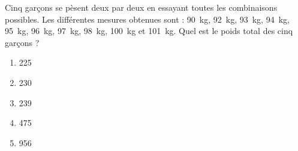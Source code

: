 Cinq garçons se pèsent deux par deux en essayant toutes les combinaisons possibles. Les différentes mesures obtenues sont : 90~kg, 92~kg, 93~kg, 94~kg, 95~kg, 96~kg, 97~kg, 98~kg, 100~kg et 101~kg. Quel est le poids total des cinq garçons ?
\begin{multicols}{5}
  \begin{enumerate}[A/]
  \item 225
  \item 230
  \item 239
  \item 475
  \item 956
  \end{enumerate}
\end{multicols}